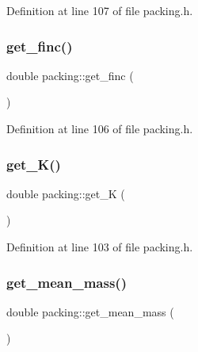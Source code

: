 Definition at line 107 of file packing.\+h.

\mbox{\label{classpacking_a58b555de4a9902399b3ab82dabfefd12}} 
\subsubsection{\texorpdfstring{get\+\_\+finc()}{get\_finc()}}
{\footnotesize\ttfamily double packing\+::get\+\_\+finc (\begin{DoxyParamCaption}{ }\end{DoxyParamCaption})\hspace{0.3cm}{\ttfamily [inline]}}



Definition at line 106 of file packing.\+h.

\mbox{\label{classpacking_ab484a3d36c45db72614267af5a203f76}} 
\subsubsection{\texorpdfstring{get\+\_\+\+K()}{get\_K()}}
{\footnotesize\ttfamily double packing\+::get\+\_\+K (\begin{DoxyParamCaption}{ }\end{DoxyParamCaption})\hspace{0.3cm}{\ttfamily [inline]}}



Definition at line 103 of file packing.\+h.

\mbox{\label{classpacking_aed06b7bd33506e2e26fd4b95749873a8}} 
\subsubsection{\texorpdfstring{get\+\_\+mean\+\_\+mass()}{get\_mean\_mass()}}
{\footnotesize\ttfamily double packing\+::get\+\_\+mean\+\_\+mass (\begin{DoxyParamCaption}{ }\end{DoxyParamCaption})}



